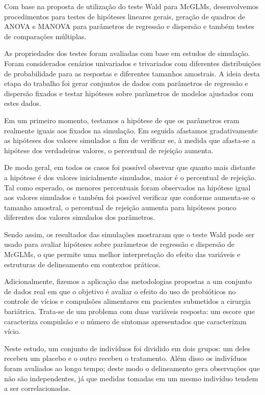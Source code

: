 \documentclass[AMA,STIX1COL]{WileyNJD-v2}
\begin{document}
Com base na proposta de utilização do teste Wald para McGLMs, desenvolvemos procedimentos para testes de hipóteses lineares gerais, geração de quadros de ANOVA e MANOVA para parâmetros de regressão e dispersão e também testes de comparações múltiplas.

As propriedades dos testes foram avaliadas com base em estudos de simulação. Foram considerados cenários univariados e trivariados com diferentes distribuições de probabilidade para as respostas e diferentes tamanhos amostrais. A ideia desta etapa do trabalho foi gerar conjuntos de dados com parâmetros de regressão e dispersão fixados e testar hipóteses sobre parâmetros de modelos ajustados com estes dados. 

Em um primeiro momento, testamos a hipótese de que os parâmetros eram realmente iguais aos fixados na simulação. Em seguida afastamos gradativamente as hipóteses dos valores simulados a fim de verificar se, à medida que afasta-se a hipótese dos verdadeiros valores, o percentual de rejeição aumenta. 

De modo geral, em todos os casos foi possível observar que quanto mais distante a hipótese é dos valores inicialmente simulados, maior é o percentual de rejeição. Tal como esperado, os menores percentuais foram observados na hipótese igual aos valores simulados e também foi possível verificar que conforme aumenta-se o tamanho amostral, o percentual de rejeição aumenta para hipóteses pouco diferentes dos valores simulados dos parâmetros.

Sendo assim, os resultados das simulações mostraram que o teste Wald pode ser usado para avaliar hipóteses sobre parâmetros de regressão e dispersão de McGLMs, o que permite uma melhor interpretação do efeito das variáveis e estruturas de delineamento em contextos práticos.

Adicionalmente, fizemos a aplicação das metodologias propostas a um conjunto de dados real em que o objetivo é avaliar o efeito do uso de probióticos no controle de vícios e compulsões alimentares em pacientes submetidos a cirurgia bariátrica. Trata-se de um problema com duas variáveis resposta: um escore que caracteriza compulsão e o número de sintomas apresentados que caracterizam vício. 

Neste estudo, um conjunto de indivíduos foi dividido em dois grupos: um deles recebeu um placebo e o outro recebeu o tratamento. Além disso os indivíduos foram avaliados ao longo tempo; deste modo o delineamento gera observações que não são independentes, já que medidas tomadas em um mesmo indivíduo tendem a ser correlacionadas. 
\end{document}
